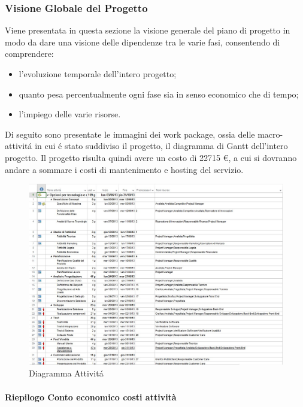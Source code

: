 \subsubsection{Visione Globale del Progetto}
Viene presentata in questa sezione la visione generale del piano di progetto in modo da
dare una visione delle dipendenze tra le varie fasi, consentendo di comprendere:
\begin{itemize}
\item l'evoluzione temporale dell'intero progetto;
\item quanto pesa percentualmente ogni fase sia in senso economico che di tempo;
\item l'impiego delle varie risorse.
\end{itemize}
Di seguito sono presentate le immagini dei work package, ossia delle macro-attivit\'a in cui
\'e stato suddiviso il progetto, il diagramma di Gantt dell'intero progetto.
Il progetto risulta quindi avere un costo di 22715 \euro{}, a cui si dovranno andare a
sommare i costi di mantenimento e hosting del servizio.

\begin{figure}[H]
\begin{center}
\includegraphics[width=1\textwidth]{img/Attivita.jpg}
\caption{Diagramma  Attivit\'a}
\label{fig:Diagramma Attivit\'a}
\end{center}
\end{figure}

\newpage

\paragraph{Riepilogo Conto economico costi attivit\`{a}}

